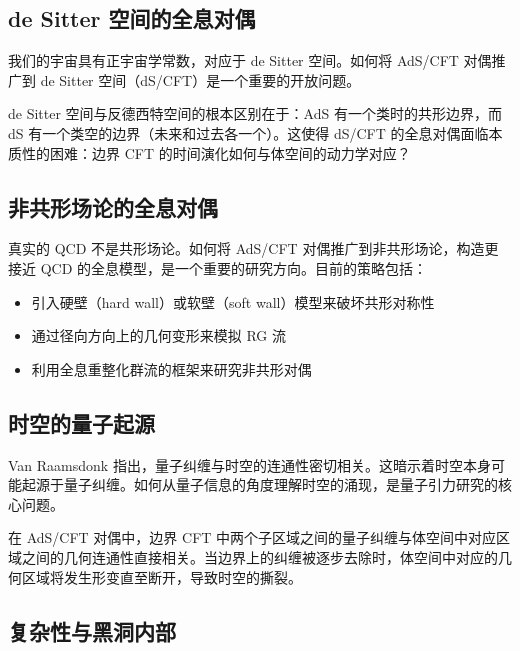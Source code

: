 \subsection{de Sitter 空间的全息对偶}

我们的宇宙具有正宇宙学常数，对应于 de Sitter 空间。如何将 AdS/CFT 对偶推广到 de Sitter 空间（dS/CFT）是一个重要的开放问题。

\begin{remark}
de Sitter 空间与反德西特空间的根本区别在于：AdS 有一个类时的共形边界，而 dS 有一个类空的边界（未来和过去各一个）。这使得 dS/CFT 的全息对偶面临本质性的困难：边界 CFT 的时间演化如何与体空间的动力学对应？
\end{remark}

\subsection{非共形场论的全息对偶}

真实的 QCD 不是共形场论。如何将 AdS/CFT 对偶推广到非共形场论，构造更接近 QCD 的全息模型，是一个重要的研究方向。目前的策略包括：
\begin{itemize}
    \item 引入硬壁（hard wall）或软壁（soft wall）模型来破坏共形对称性
    \item 通过径向方向上的几何变形来模拟 RG 流
    \item 利用全息重整化群流的框架来研究非共形对偶
\end{itemize}

\subsection{时空的量子起源}

Van Raamsdonk \cite{VanRaamsdonk2010} 指出，量子纠缠与时空的连通性密切相关。这暗示着时空本身可能起源于量子纠缠。如何从量子信息的角度理解时空的涌现，是量子引力研究的核心问题。

\begin{theorem}
在 AdS/CFT 对偶中，边界 CFT 中两个子区域之间的量子纠缠与体空间中对应区域之间的几何连通性直接相关。当边界上的纠缠被逐步去除时，体空间中对应的几何区域将发生形变直至断开，导致时空的撕裂。
\end{theorem}

\subsection{复杂性与黑洞内部}

